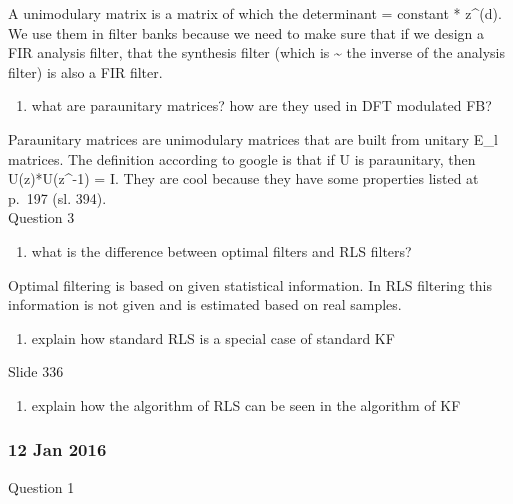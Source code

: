 \documentclass[
  a4paper,
  ,captions=tableheading
]{scrartcl}
\providecommand{\tightlist}{%
  \setlength{\itemsep}{0pt}\setlength{\parskip}{0pt}}
\begin{document}
A unimodulary matrix is a matrix of which the determinant = constant *
z\^{}(d). We use them in filter banks because we need to make sure that
if we design a FIR analysis filter, that the synthesis filter (which is
\textasciitilde{} the inverse of the analysis filter) is also a FIR
filter.

\begin{enumerate}
\def\labelenumi{\arabic{enumi}.}
\setcounter{enumi}{2}
\tightlist
\item
  what are paraunitary matrices? how are they used in DFT modulated FB?
\end{enumerate}

Paraunitary matrices are unimodulary matrices that are built from
unitary E\_l matrices. The definition according to google is that if U
is paraunitary, then U(z)*U(z\^{}-1) = I. They are cool because they
have some properties listed at p.~197 (sl. 394).\\
Question 3

\begin{enumerate}
\def\labelenumi{\arabic{enumi}.}
\tightlist
\item
  what is the difference between optimal filters and RLS filters?
\end{enumerate}

Optimal filtering is based on given statistical information. In RLS
filtering this information is not given and is estimated based on real
samples.

\begin{enumerate}
\def\labelenumi{\arabic{enumi}.}
\setcounter{enumi}{1}
\tightlist
\item
  explain how standard RLS is a special case of standard KF
\end{enumerate}

Slide 336

\begin{enumerate}
\def\labelenumi{\arabic{enumi}.}
\setcounter{enumi}{2}
\tightlist
\item
  explain how the algorithm of RLS can be seen in the algorithm of KF
\end{enumerate}

\subsubsection{\texorpdfstring{\textbf{12 Jan
2016}}{12 Jan 2016}}\label{jan-2016-1}

Question 1
\end{document}
